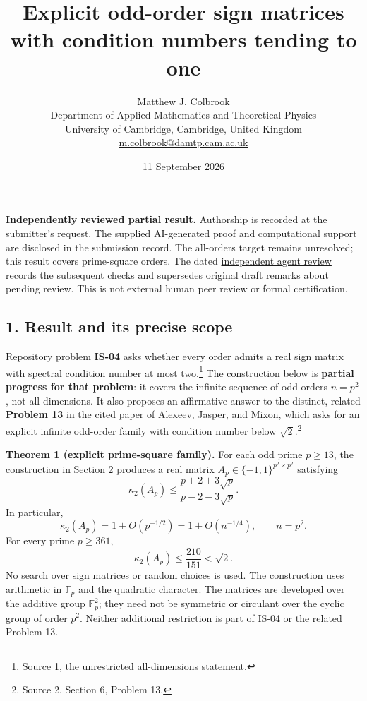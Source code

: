 \documentclass[
  11pt,
]{article}
\title{Explicit odd-order sign matrices with condition numbers tending
to one}
\author{Matthew J. Colbrook\\\small Department of Applied Mathematics and Theoretical Physics\\\small University of Cambridge, Cambridge, United Kingdom\\\small\href{mailto:m.colbrook@damtp.cam.ac.uk}{m.colbrook@damtp.cam.ac.uk}}
\date{11 September 2026}
\begin{document}
\maketitle

\noindent\textbf{Independently reviewed partial result.} Authorship is recorded at the submitter's request. The supplied AI-generated proof and computational support are disclosed in the submission record. The all-orders target remains unresolved; this result covers prime-square orders.
The dated \href{https://github.com/MColbrook/OpenProblemsInNLA/blob/codex/colbrook-round3-submissions/references/colbrook-round3-2026-09-11/verification/reviews/IS-04-review.md}{independent agent review} records the subsequent checks and supersedes original draft remarks about pending review. This is not external human peer review or formal certification.
\par\medskip


\subsection{1. Result and its precise
scope}\label{result-and-its-precise-scope}

Repository problem \textbf{IS-04} asks whether every order admits a real
sign matrix with spectral condition number at most two.\footnote{Source
  1, the unrestricted all-dimensions statement.} The construction below
is \textbf{partial progress for that problem}: it covers the infinite
sequence of odd orders \(n=p^2\), not all dimensions. It also proposes
an affirmative answer to the distinct, related \textbf{Problem 13} in
the cited paper of Alexeev, Jasper, and Mixon, which asks for an
explicit infinite odd-order family with condition number below
\(\sqrt2\).\footnote{Source 2, Section 6, Problem 13.}

\textbf{Theorem 1 (explicit prime-square family).} For each odd prime
\(p\geq13\), the construction in Section 2 produces a real matrix
\(A_p\in\{-1,1\}^{p^2\times p^2}\) satisfying \[
\kappa_2(A_p)
\leq\frac{p+2+3\sqrt p}{p-2-3\sqrt p}. \tag{1}
\] In particular, \[
\kappa_2(A_p)=1+O(p^{-1/2})=1+O(n^{-1/4}),\qquad n=p^2.
\] For every prime \(p\geq361\), \[
\kappa_2(A_p)\leq\frac{210}{151}<\sqrt2. \tag{2}
\] No search over sign matrices or random choices is used. The
construction uses arithmetic in \(\mathbb F_p\) and the quadratic
character. The matrices are developed over the additive group
\(\mathbb F_p^2\); they need not be symmetric or circulant over the
cyclic group of order \(p^2\). Neither additional restriction is part of
IS-04 or the related Problem 13.
\end{document}
